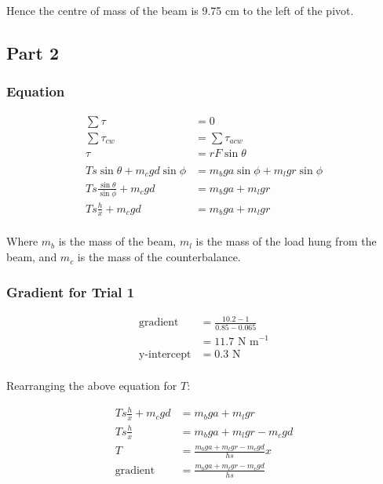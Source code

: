 \documentclass[a4paper,11pt]{article}
\begin{document}
Hence the centre of mass of the beam is 9.75 cm to the left of the pivot.


\subsection{Part 2}

\subsubsection{Equation}

$$
\begin{aligned}
\sum \tau & = 0 \\
\sum \tau_{cw} & = \sum \tau_{acw} \\
\tau & = r F \sin{\theta} \\
\\
T s \sin{\theta} + m_c g d \sin{\phi} & = m_b g a \sin{\phi} + m_l g r \sin{\phi} \\
T s \frac{\sin{\theta}}{\sin{\phi}} + m_c g d & = m_b g a + m_l g r \\
T s \frac{h}{x} + m_c g d & = m_b g a + m_l g r \\
\end{aligned}
$$

Where $m_b$ is the mass of the beam, $m_l$ is the mass of the load hung from the
beam, and $m_c$ is the mass of the counterbalance.


\subsubsection{Gradient for Trial 1}

$$
\begin{aligned}
\mbox{gradient} & = \frac{10.2 - 1}{0.85 - 0.065} \\
	& = 11.7\mbox{ N m}^{-1} \\
\mbox{y-intercept} & = 0.3\mbox{ N} \\
\end{aligned}
$$

Rearranging the above equation for $T$:

$$
\begin{aligned}
T s \frac{h}{x} + m_c g d & = m_b g a + m_l g r \\
T s \frac{h}{x} & = m_b g a + m_l g r - m_c g d \\
T & = \frac{m_b g a + m_l g r - m_c g d}{h s} x \\
\mbox{gradient} & = \frac{m_b g a + m_l g r - m_c g d}{h s} \\
\end{aligned}
$$
\end{document}
